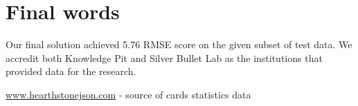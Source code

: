 \documentclass[a4paper]{article}
\begin{document}
\section{Final words}
Our final solution achieved 5.76 RMSE score on the given subset of test data. We accredit both Knowledge Pit and Silver Bullet Lab as the institutions that provided data for the research.

\begin{thebibliography}{9}
 \url{www.hearthstonejson.com} - source of cards statistics data



\end{thebibliography}
\end{document}
